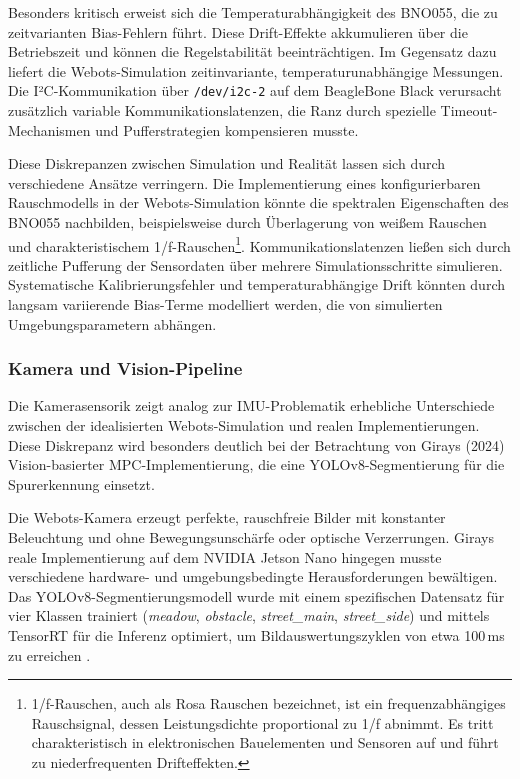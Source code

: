 Besonders kritisch erweist sich die Temperaturabhängigkeit des BNO055, die zu zeitvarianten Bias-Fehlern führt. Diese Drift-Effekte 
akkumulieren über die Betriebszeit und können die Regelstabilität beeinträchtigen. Im Gegensatz dazu liefert die Webots-Simulation 
zeitinvariante, temperaturunabhängige Messungen. Die I²C-Kommunikation über \texttt{/dev/i2c-2} auf dem BeagleBone Black verursacht 
zusätzlich variable Kommunikationslatenzen, die Ranz durch spezielle Timeout-Mechanismen und Pufferstrategien kompensieren musste.

Diese Diskrepanzen zwischen Simulation und Realität lassen sich durch verschiedene Ansätze verringern. Die Implementierung eines 
konfigurierbaren Rauschmodells in der Webots-Simulation könnte die spektralen Eigenschaften des BNO055 nachbilden, beispielsweise
durch Überlagerung von weißem Rauschen und charakteristischem 1/f-Rauschen\footnote{1/f-Rauschen, auch als Rosa Rauschen bezeichnet, 
ist ein frequenzabhängiges Rauschsignal, dessen Leistungsdichte proportional zu 1/f abnimmt. Es tritt charakteristisch in 
elektronischen Bauelementen und Sensoren auf und führt zu niederfrequenten Drifteffekten.}. Kommunikationslatenzen ließen sich durch zeitliche 
Pufferung der Sensordaten über mehrere Simulationsschritte simulieren. Systematische Kalibrierungsfehler und temperaturabhängige 
Drift könnten durch langsam variierende Bias-Terme modelliert werden, die von simulierten Umgebungsparametern abhängen.


\subsubsection{Kamera und Vision-Pipeline}
Die Kamerasensorik zeigt analog zur IMU-Problematik erhebliche Unterschiede zwischen der 
idealisierten Webots-Simulation und realen Implementierungen. Diese Diskrepanz wird besonders deutlich bei der Betrachtung von 
Girays (2024) Vision-basierter MPC-Implementierung, die eine YOLOv8-Segmentierung für die Spurerkennung einsetzt.

Die Webots-Kamera erzeugt perfekte, rauschfreie Bilder mit konstanter Beleuchtung und ohne Bewegungsunschärfe oder optische 
Verzerrungen. Girays reale Implementierung auf dem NVIDIA Jetson Nano hingegen musste verschiedene hardware- und umgebungsbedingte 
Herausforderungen bewältigen. Das YOLOv8-Segmentierungsmodell wurde mit einem spezifischen Datensatz für vier Klassen trainiert 
(\textit{meadow}, \textit{obstacle}, \textit{street\_main}, \textit{street\_side}) und mittels TensorRT für die Inferenz optimiert, 
um Bildauswertungszyklen von etwa 100\,ms zu erreichen \citep{vision_mpc_readme}.

